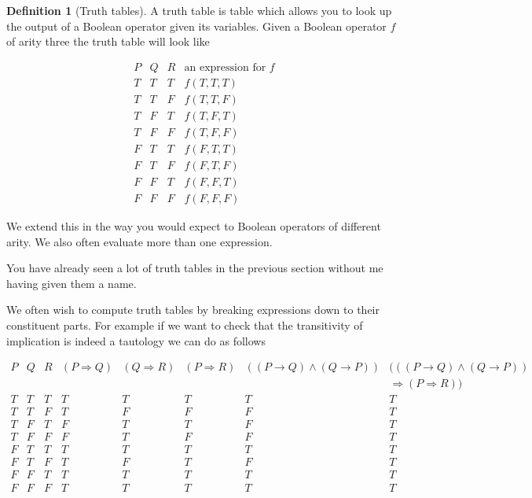 \documentclass[
]{book}
\theoremstyle{definition}
\newtheorem{definition}{Definition}[chapter]
\theoremstyle{definition}
\theoremstyle{definition}
\theoremstyle{definition}
\theoremstyle{remark}
\begin{document}
\begin{definition}[Truth tables]
A truth table is table which allows you to look up the output of a Boolean operator given its variables. Given a Boolean operator \(f\) of arity three the truth table will look like

\begin{equation}
\begin{array}{ccc|c}
P & Q & R & \mbox{an expression for \(f\)} \\
\hline
T & T & T & f(T,T,T)\\
T & T & F & f(T,T,F)\\
T & F & T & f(T,F,T)\\
T & F & F & f(T,F,F)\\
F & T & T & f(F,T,T)\\
F & T & F & f(F,T,F)\\
F & F & T & f(F,F,T)\\
F & F & F & f(F,F,F)
\end{array}
\end{equation}

We extend this in the way you would expect to Boolean operators of different arity. We also often evaluate more than one expression.

You have already seen a lot of truth tables in the previous section without me having given them a name.
\end{definition}

We often wish to compute truth tables by breaking expressions down to their constituent parts. For example if we want to check that the transitivity of implication is indeed a tautology we can do as follows

\begin{equation}
\begin{array}{ccc|ccccc}
P & Q & R & (P \Rightarrow Q) & (Q \Rightarrow R) & (P \Rightarrow R) & ((P\rightarrow Q)\wedge (Q\rightarrow P)) & (((P\rightarrow Q)\wedge (Q\rightarrow P))\\
 \, & \, & \, & \, & \, & \, & \, &\Rightarrow (P \Rightarrow R)) \\
\hline
T & T & T & T & T & T & T & T\\
T & T & F & T & F & F & F & T\\
T & F & T & F & T & T & F & T\\
T & F & F & F & T & F & F & T\\
F & T & T & T & T & T & T & T\\
F & T & F & T & F & T & F & T\\
F & F & T & T & T & T & T & T\\
F & F & F & T & T & T & T & T
\end{array}
\end{equation}
\end{document}
